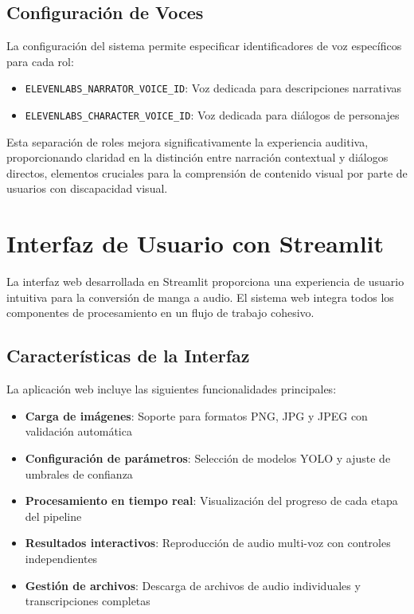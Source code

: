 \documentclass[conference]{IEEEtran}
\begin{document}
\subsection{Configuración de Voces}
La configuración del sistema permite especificar identificadores de voz específicos para cada rol:
\begin{itemize}
\item \texttt{ELEVENLABS\_NARRATOR\_VOICE\_ID}: Voz dedicada para descripciones narrativas
\item \texttt{ELEVENLABS\_CHARACTER\_VOICE\_ID}: Voz dedicada para diálogos de personajes
\end{itemize}

Esta separación de roles mejora significativamente la experiencia auditiva, proporcionando claridad en la distinción entre narración contextual y diálogos directos, elementos cruciales para la comprensión de contenido visual por parte de usuarios con discapacidad visual.

\section{Interfaz de Usuario con Streamlit}
La interfaz web desarrollada en Streamlit proporciona una experiencia de usuario intuitiva para la conversión de manga a audio. El sistema web integra todos los componentes de procesamiento en un flujo de trabajo cohesivo.

\subsection{Características de la Interfaz}
La aplicación web incluye las siguientes funcionalidades principales:
\begin{itemize}
\item \textbf{Carga de imágenes}: Soporte para formatos PNG, JPG y JPEG con validación automática
\item \textbf{Configuración de parámetros}: Selección de modelos YOLO y ajuste de umbrales de confianza
\item \textbf{Procesamiento en tiempo real}: Visualización del progreso de cada etapa del pipeline
\item \textbf{Resultados interactivos}: Reproducción de audio multi-voz con controles independientes
\item \textbf{Gestión de archivos}: Descarga de archivos de audio individuales y transcripciones completas
\end{itemize}
\end{document}
